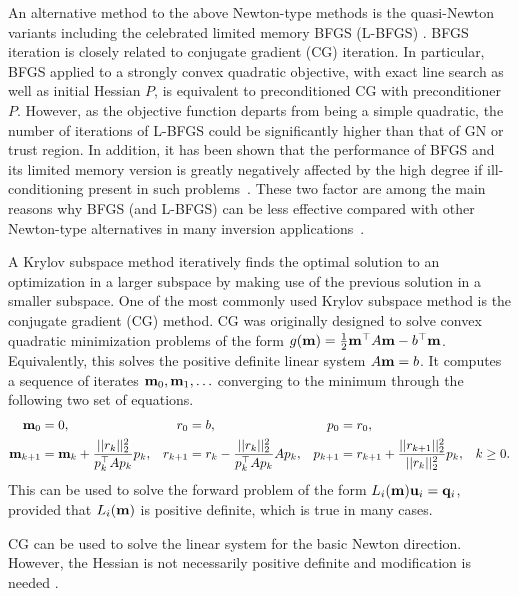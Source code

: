 \medskip{}
An alternative method to the above Newton-type methods is the quasi-Newton
variants including the celebrated limited memory BFGS (L-BFGS)
\cite{liu1989limited,nocedal1980updating}.
BFGS iteration is closely related to conjugate gradient (CG) iteration. In particular, BFGS applied to a strongly convex 
quadratic objective, with exact line search as well as initial Hessian $ P $, is equivalent to preconditioned CG with preconditioner $ P $. However, as the objective function departs from being a simple quadratic, the number of iterations of L-BFGS could be significantly higher than that of GN or trust region. In addition, it has been shown that the performance of BFGS and its limited memory version is greatly negatively affected by the high degree if ill-conditioning present in such problems~\cite{romassn1, romassn2,pyrrm_ssn_nonuni}. These two factor are among the main reasons why BFGS (and L-BFGS) can be less effective compared with other Newton-type alternatives in many inversion applications~\cite{haber2004quasi}.

\medskip{}
A Krylov subspace method iteratively finds the optimal solution to an
optimization in a larger subspace by making use of the previous solution in a
smaller subspace.
One of the most commonly used Krylov subspace method is the conjugate gradient
(CG) method.
CG was originally designed to solve convex quadratic minimization problems of
the form $g({\bf m}) = \frac{1}{2} {\bf m}^{\top} A {\bf m} - b^{\top} {\bf m}$.
Equivalently, this solves the positive definite linear system $A{\bf m} = b$.
It computes a sequence of iterates ${\bf m}_0, {\bf m}_1, \ldots$ converging to the minimum
through the following two set of equations.
\begin{align}
	{\bf m}_0 &=0, & r_0 &= b, & p_0 &= r_0, & \\
  {\bf m}_{k+1} &= {\bf m}_{k} + \frac{||r_k||_2^2}{p_{k}^{\top} A p_{k}} p_{k}, 
    &
  r_{k+1} &= r_{k} - \frac{||r_k||_2^2}{p_{k}^{\top} A p_{k}} A p_k,
    &
	p_{k+1} &= r_{k+1} + \frac{||r_{k+1}||_2^2}{||r_{k}||_2^2} p_{k}, & k \ge 0.
\end{align}
This can be used to solve the forward problem of the form 
$L_{i}({\bf m}) {\bf u}_{i} = {\bf q}_{i}$, provided that $L_{i}({\bf m})$ is positive definite, which
is true in many cases.

CG can be used to solve the linear system for the basic Newton direction.
However, the Hessian is not necessarily positive definite and modification is
needed \cite{nocedal2006numerical}.

